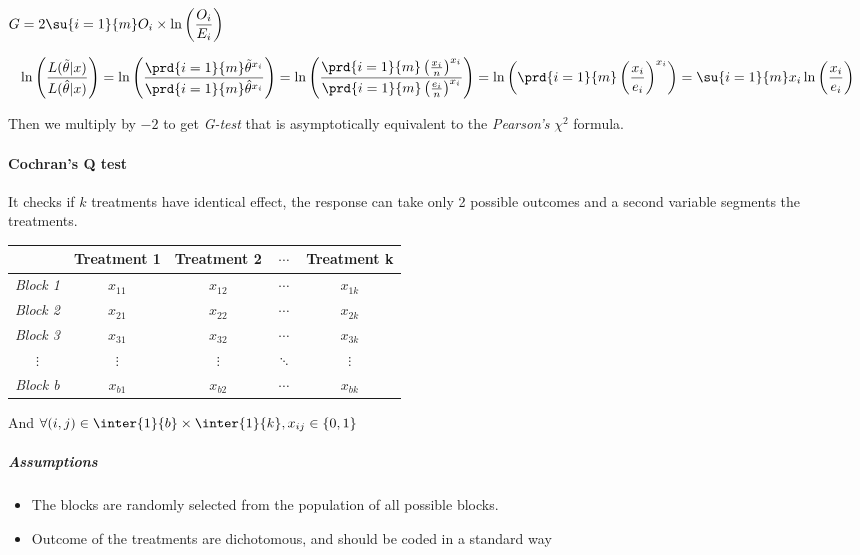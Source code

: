 \begin{center}
    $G = 2\su{i=1}{m}O_{i}\times\ln\left(\dfrac{O_{i}}{E_{i}}\right)$
\end{center}

$$
\ln\left(\dfrac{L(\tilde{\theta}|x)}{L(\hat{\theta}|x)}\right)
= \ln\left(\dfrac{\prd{i=1}{m}\tilde{\theta}^{x_{i}}}{\prd{i=1}{m}\hat{\theta}^{x_{i}}}\right)
= \ln\left(\dfrac{\prd{i=1}{m}\left(\frac{x_{i}}{n}\right)^{x_{i}}}{\prd{i=1}{m}\left(\frac{e_{i}}{n}\right)^{x_{i}}}\right)
= \ln\left(\prd{i=1}{m}\left(\dfrac{x_{i}}{e_{i}}\right)^{x_{i}}\right)
= \su{i=1}{m}x_{i}\ln\left(\dfrac{x_{i}}{e_{i}}\right)
$$

Then we multiply by $-2$ to get \emph{G-test} that is asymptotically equivalent to the 
\emph{Pearson's} $\chi^{2}$ formula.


\paragraph{Cochran's Q test}
It checks if $k$ treatments have identical effect, the response can take only 2 possible 
outcomes and a second variable segments the treatments.

\begin{center}
    \begin{tabularx}{.65\textwidth}{|*{5}{c|}}
    \hline
     & \textbf{Treatment 1} & \textbf{Treatment 2} & $\cdots$  & \textbf{Treatment k}\\
    \hline
    \emph{Block 1} & $x_{11}$ & $x_{12}$ & $\cdots$  & $x_{1k}$\\
    \hline
    \emph{Block 2} & $x_{21}$ & $x_{22}$ & $\cdots$  & $x_{2k}$\\
    \hline
    \emph{Block 3} & $x_{31}$ & $x_{32}$ & $\cdots$  & $x_{3k}$\\
    \hline
    $\vdots$ & $\vdots$ & $\vdots$ & $\ddots$ & $\vdots$ \\
    \hline
    \emph{Block b} & $x_{b1}$ & $x_{b2}$ & $\cdots$  & $x_{bk}$\\
    \hline
    \end{tabularx}
\end{center}
And $\forall (i,j)\in\inter{1}{b}\times\inter{1}{k}, x_{ij}\in\left\{0, 1\right\}$

\subparagraph{Assumptions}
\begin{itemize}
    \item The blocks are randomly selected from the population of all possible blocks.
    \item Outcome of the treatments are dichotomous, and should be coded in a standard way
\end{itemize}

